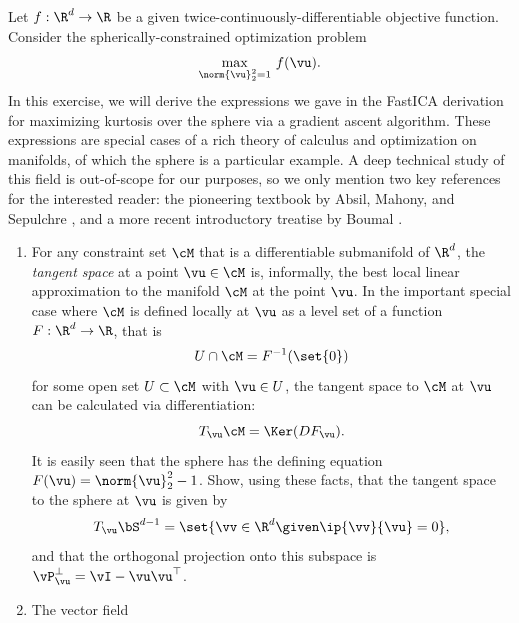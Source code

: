 \documentclass[../../book-main.tex]{subfiles}
\begin{document}
\begin{exercise}\label{exercise:sphere-calculus}
    Let $f : \R^d \to \R$ be a given twice-continuously-differentiable objective function. Consider the spherically-constrained optimization problem
    \begin{equation}\label{eq:exercise-sphere-constrained-max}
        \max_{\norm{\vu}_2^2 = 1}\, f(\vu). 
    \end{equation}
    In this exercise, we will derive the expressions we gave in the FastICA derivation for maximizing kurtosis over the sphere via a gradient ascent algorithm.
    These expressions are special cases of a rich theory of calculus and optimization on manifolds, of which the sphere is a particular example. A deep technical study of this field is out-of-scope for our purposes, so we only mention two key references for the interested reader: the pioneering textbook by Absil, Mahony, and Sepulchre
    \cite{Absil2009-nc}, and a more recent introductory treatise by Boumal \cite{Boumal2023-rj}. 
    \begin{enumerate}
        \item For any constraint set $\cM$ that is a differentiable submanifold of $\R^d$, the 
        \textit{tangent space} at a point $\vu \in \cM$ is, informally, the best local linear approximation to the manifold $\cM$ at the point $\vu$.
        In the important special case where $\cM$ is defined locally at $\vu$ as a level set of a function $F : \R^d \to \R$,
        that is
        \begin{equation*}
            U \cap \cM = F^{-1}(\set{0})
        \end{equation*}
        for some open set $U \subset \cM$ with $\vu \in U$,
        the tangent space to $\cM$ at $\vu$ can be calculated 
        via differentiation:
        \begin{equation*}
            T_{\vu} \cM = \Ker(DF_{\vu}).
        \end{equation*}
        It is easily seen that the sphere has the defining equation $F(\vu) = \norm{\vu}_2^2 - 1$.
        Show, using these facts, that the tangent space to the sphere at $\vu$ is given by
        \begin{equation*}
            T_{\vu} \bS^{d-1} = \set{\vv \in \R^d \given \ip{\vv}{\vu} = 0},
        \end{equation*}
        and that the orthogonal projection onto this subspace is $\vP_{\vu}^\perp = \vI - \vu\vu^\top$.
        \item The vector field 
        \begin{equation}\label{eq:exercise-riemann-grad-sphere}

\end{equation}
\end{enumerate}
\end{exercise}
\end{document}

